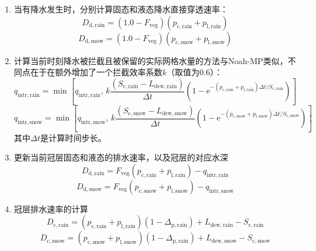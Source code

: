 \begin{enumerate}
  \item 当有降水发生时，分别计算固态和液态降水直接穿透速率：
    \begin{equation}
      D_{\mathrm{d,rain}}=\left(1.0-F_{\mathrm{veg}}\right)  (p_{\mathrm{c,rain}}+p_{\mathrm{l,rain}})
    \end{equation}
    \begin{equation}
      D_{\mathrm{d,snow}}=\left(1.0-F_{\mathrm{veg}}\right)  (p_{\mathrm{c,snow}}+p_{\mathrm{l,snow}})
    \end{equation}
  \item 计算当前时刻降水被拦截且被保留的实际网格水量的方法与Noah-MP类似，不同点在于在额外增加了一个拦截效率系数$k$（取值为0.6）：
    \begin{equation}
      q_{\mathrm{intr,rain}} = \min\left[q_{\mathrm{intr,rain}},\,  k  \frac{(S_{\mathrm{c,rain}} - L_{\mathrm{dew,rain}})}{\Delta{t}} \left(1-{\mathrm e}^{-\left(p_{\mathrm{c,rain}}+p_{\mathrm{l,rain}}\right)\Delta{t}/S_{\mathrm{c,rain}}}\right)\right]
    \end{equation}
    \begin{equation}
      q_{\mathrm{intr,snow}} = \min\left[q_{\mathrm{intr,snow}},\, k  \frac{(S_{\mathrm{c,snow}} - L_{\mathrm{dew,snow}})}{\Delta{t}}\left(1-{\mathrm e}^{-\left(p_{\mathrm{c,snow}}+p_{\mathrm{l,snow}}\right)\Delta{t}/S_{\mathrm{c,snow}}}\right)\right]
    \end{equation}
    其中${\Delta{t}}$是计算时间步长。
  \item 更新当前冠层固态和液态的排水速率，以及冠层的对应水深
    \begin{equation}
      D_{\mathrm{d,rain}}=F_{\mathrm{veg}}  (p_{\mathrm{c,rain}}+p_{\mathrm{l,rain}})-q_{\mathrm{intr,rain}}
    \end{equation}
    \begin{equation}
      D_{\mathrm{d,snow}}=F_{\mathrm{veg}}  (p_{\mathrm{c,snow}}+p_{\mathrm{l,snow}})-q_{\mathrm{intr,snow}}
    \end{equation}
  \item 冠层排水速率的计算
    \begin{equation}
      D_{\mathrm{c,rain}}=\left(p_{\mathrm{c,rain}}+p_{\mathrm{l,rain}}\right)\left(1-\Delta_{\mathrm{p,rain}}\right)+L_{\mathrm{dew,rain}}-S_{\mathrm{c,rain}}
    \end{equation}
    \begin{equation}
      D_{\mathrm{c,snow}}=\left(p_{\mathrm{c,snow}}+p_{\mathrm{l,snow}}\right)\left(1-\Delta_{\mathrm{p,rain}}\right)+L_{\mathrm{dew,snow}}-S_{\mathrm{c,snow}}
    \end{equation}

\end{enumerate}

